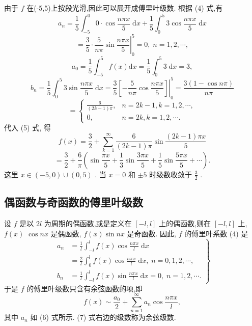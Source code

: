 \begin{solution}

\end{solution}
由于 \(f\) 在(-5,5)上按段光滑,因此可以展开成傅里叶级数. 根据 (4) 式,有
\[
{a}_{n} = \frac{1}{5}{\int }_{-5}^{0}0 \cdot  \cos \frac{n\pi x}{5}\mathrm{\;d}x + \frac{1}{5}{\int }_{0}^{5}3\cos \frac{n\pi x}{5}\mathrm{\;d}x
\]
\[
= \frac{3}{5} \cdot  {\left. \frac{5}{n\pi }\sin \frac{n\pi x}{5}\right| }_{0}^{5} = 0,\;n = 1,2,\cdots ,
\]
\[
{a}_{0} = \frac{1}{5}{\int }_{-5}^{5}f\left( x\right) \mathrm{d}x = \frac{1}{5}{\int }_{0}^{5}3\mathrm{\;d}x = 3,
\]
\[
{b}_{n} = \frac{1}{5}{\int }_{0}^{5}3\sin \frac{n\pi x}{5}\mathrm{\;d}x = {\left. \frac{3}{5}\left\lbrack  -\frac{5}{n\pi }\cos \frac{n\pi x}{5}\right\rbrack  \right| }_{0}^{5} = \frac{3\left( {1 - \cos {n\pi }}\right) }{n\pi }
\]
\[
= \left\{  \begin{matrix} \frac{6}{\left( {{2k} - 1}\right) \pi }, & n = {2k} - 1,k = 1,2,\cdots , \\  0, & n = {2k},k = 1,2,\cdots . \end{matrix}\right.
\]
代入 (5) 式, 得
\[
f\left( x\right)  = \frac{3}{2} + \mathop{\sum }\limits_{{k = 1}}^{\infty }\frac{6}{\left( {{2k} - 1}\right) \pi }\sin \frac{\left( {{2k} - 1}\right) {\pi x}}{5}
\]
\[
= \frac{3}{2} + \frac{6}{\pi }\left( {\sin \frac{\pi x}{5} + \frac{1}{3}\sin \frac{3\pi x}{5} + \frac{1}{5}\sin \frac{5\pi x}{5} + \cdots }\right) .
\]
这里 \(x \in  \left( {-5,0}\right)  \cup  \left( {0,5}\right)\) . 当 \(x = 0\) 和 \(\pm  5\) 时级数收敛于 \(\frac{3}{2}\) .

\subsection{偶函数与奇函数的傅里叶级数}

设 \(f\) 是以 \({2l}\) 为周期的偶函数,或是定义在 \(\left\lbrack  {-l,l}\right\rbrack\) 上的偶函数,则在 \(\left\lbrack  {-l,l}\right\rbrack\) 上, \(f\left( x\right)\)  \(\cos {nx}\) 是偶函数, \(f\left( x\right) \sin {nx}\) 是奇函数. 因此, \(f\) 的傅里叶系数 (4) 是
\[
\left. \begin{aligned} {a}_{n} &  = \frac{1}{l}{\int }_{-l}^{l}f\left( x\right) \cos \frac{n\pi x}{l}\mathrm{\;d}x \\   &  = \frac{2}{l}{\int }_{0}^{l}f\left( x\right) \cos \frac{n\pi x}{l}\mathrm{\;d}x,\;n = 0,1,2,\cdots , \\  {b}_{n} &  = \frac{1}{l}{\int }_{-l}^{l}f\left( x\right) \sin \frac{n\pi x}{l}\mathrm{\;d}x = 0,\;n = 1,2,\cdots . \end{aligned}\right\}   \tag{6}
\]
于是 \(f\) 的傅里叶级数只含有余弦函数的项,即
\[
f\left( x\right)  \sim  \frac{{a}_{0}}{2} + \mathop{\sum }\limits_{{n = 1}}^{\infty }{a}_{n}\cos \frac{n\pi x}{l}, \tag{7}
\]
其中 \({a}_{n}\) 如 (6) 式所示. (7) 式右边的级数称为余弦级数.

